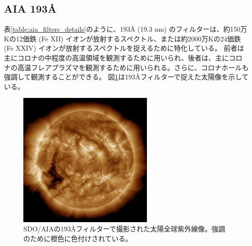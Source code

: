 \subsection{AIA 193Å}
    表\ref{table:aia_filters_details}のように、193Å (19.3 nm) のフィルターは、約150万Kの12価鉄 (Fe XII) イオンが放射するスペクトル、または約2000万Kの24価鉄 (Fe XXIV) イオンが放射するスペクトルを捉えるために特化している。
    前者は主にコロナの中程度の高温領域を観測するために用いられ、後者は、主にコロナの高温フレアプラズマを観測するために用いられる。さらに、コロナホールも強調して観測することができる。
    図\ref{fig:sample_aia193}は193Åフィルターで捉えた太陽像を示している。
    \begin{figure}[h]
        \centering
        \includegraphics[width=0.6\textwidth]{figures/data/latest_256_0193.jpg}
        \caption{SDO/AIAの193Åフィルターで撮影された太陽全球紫外線像。強調のために橙色に色付けされている。}
        \label{fig:sample_aia193}
    \end{figure}
    
